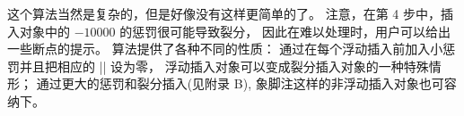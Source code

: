 \ddanger 这个算法当然是复杂的，但是好像没有这样更简单的了。%
注意，在第 4 步中，插入对象中的 $-10000$ 的惩罚很可能导致裂分，
因此在难以处理时，用户可以给出一些断点的提示。%
算法提供了各种不同的性质：
通过在每个浮动插入前加入小惩罚并且把相应的 |\floatingpenalty| 设为零，
浮动插入对象可以变成裂分插入对象的一种特殊情形；
通过更大的惩罚和裂分插入(见附录 B),
象脚注这样的非浮动插入对象也可容纳下。

